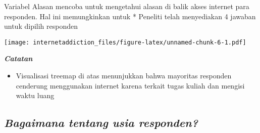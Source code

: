 \documentclass[
]{article}
\newenvironment{Shaded}{\begin{snugshade}}{\end{snugshade}}
\newcommand{\DataTypeTok}[1]{\textcolor[rgb]{0.13,0.29,0.53}{#1}}
\newcommand{\DecValTok}[1]{\textcolor[rgb]{0.00,0.00,0.81}{#1}}
\newcommand{\KeywordTok}[1]{\textcolor[rgb]{0.13,0.29,0.53}{\textbf{#1}}}
\newcommand{\NormalTok}[1]{#1}
\newcommand{\OperatorTok}[1]{\textcolor[rgb]{0.81,0.36,0.00}{\textbf{#1}}}
\newcommand{\StringTok}[1]{\textcolor[rgb]{0.31,0.60,0.02}{#1}}
\providecommand{\tightlist}{%
  \setlength{\itemsep}{0pt}\setlength{\parskip}{0pt}}
\begin{document}
Variabel Alasan mencoba untuk mengetahui alasan di balik akses internet
para responden. Hal ini memungkinkan untuk * Peneliti telah menyediakan
4 jawaban untuk dipilih responden

\begin{Shaded}
\end{Shaded}

\texttt{[image: internetaddiction\_files/figure-latex/unnamed-chunk-6-1.pdf]}

\textbf{\emph{Catatan}}

\begin{itemize}
\tightlist
\item
  Visualisasi treemap di atas menunjukkan bahwa mayoritas responden
  cenderung menggunakan internet karena terkait tugas kuliah dan mengisi
  waktu luang
\end{itemize}

\hypertarget{bagaimana-tentang-usia-responden}{%
\subsection{\texorpdfstring{\emph{Bagaimana tentang usia
responden?}}{Bagaimana tentang usia responden?}}\label{bagaimana-tentang-usia-responden}}

\begin{Shaded}
\end{Shaded}
\end{document}

